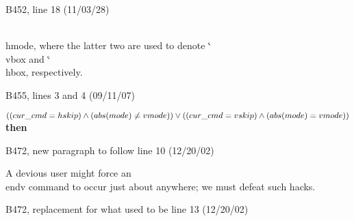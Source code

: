 {{\bugonpage B452, line 18 (11/03/28)

\noindent\\{hmode}, where the latter two are used to denote
 \.{\char`\\vbox} and \.{\char`\\hbox}, respectively.

\bugonpage B455, lines 3 and 4 (09/11/07)

\ninepoint\noindent
{} $((\\{cur\_cmd}=\\{hskip})\land(\\{abs}(\\{mode})\ne\\{vmode}))
 \lor  ((\\{cur\_cmd}=\\{vskip})\land(\\{abs}(\\{mode})=\\{vmode}))$ {\bf then}

\bugonpage B472, new paragraph to follow line 10 (12/20/02)

\tenpoint\noindent\quad
A devious user might force an \\{endv} command to occur just about anywhere;
we must defeat such hacks.

\bugonpage B472, replacement for what used to be line 13 (12/20/02)

}}
